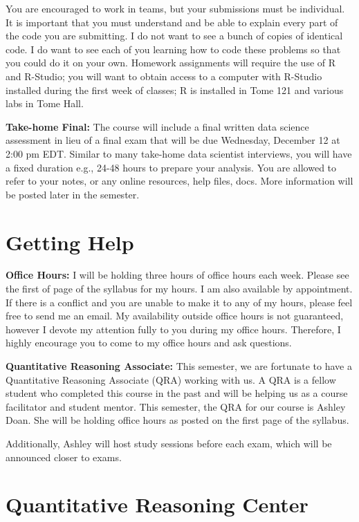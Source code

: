 \documentclass[11pt,letter]{article}
\begin{document}
You are encouraged to work in teams, but your submissions must be individual. It is important that you must understand and be able to explain every part of the code you are submitting. I do not want to see a bunch of copies of identical code. I do want to see each of you learning how to code these problems so that you could do it on your own. Homework assignments will require the use of R and R-Studio; you will want to obtain access to a computer with R-Studio installed during the first week of classes; R is installed in Tome 121 and various labs in Tome Hall.

\textbf{Take-home Final:} The course will include a final written data science assessment in lieu of a final exam that will be due Wednesday, December 12 at 2:00 pm EDT. Similar to many take-home data scientist interviews, you will have a fixed duration e.g., 24-48 hours to prepare your analysis. You are allowed to refer to your notes, or any online resources, help files, docs. More information will be posted later in the semester.

\section*{Getting Help}

\textbf{Office Hours:} I will be holding three hours of office hours each week.  Please see the first of page of the syllabus for my hours. I am also available by appointment. If there is a conflict and you are unable to make it to any of my hours, please feel free to send me an email. My availability outside office hours is not guaranteed, however I devote my attention fully to you during my office hours. Therefore, I highly encourage you to come to my office hours and ask questions.

\textbf{Quantitative Reasoning Associate:} This semester, we are fortunate to have a Quantitative Reasoning Associate (QRA) working with us. A
QRA is a fellow student who completed this course in the past and will be helping us as a course facilitator and student mentor. This semester, the QRA for our course is Ashley Doan. She will be holding office hours as posted on the first page of the syllabus. \par
Additionally, Ashley will host study sessions before each exam, which will be announced closer to exams.


\section*{Quantitative Reasoning Center}
\end{document}
